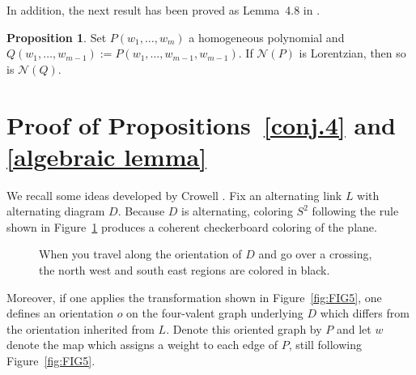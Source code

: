 \documentclass[12pt,reqno]{amsart}
\theoremstyle{definition}
\newtheorem{proposition}[theorem]{Proposition}
\def\normal{\mathcal{N}}
\begin{document}
In addition, the next result has been proved as Lemma~4.8 in \cite{branden2023lower}.

\begin{proposition}
    Set $P(w_1, \ldots,  w_m)$ a homogeneous polynomial and $Q(w_1, \ldots, w_{m-1}) := P(w_1, \ldots, w_{m-1}, w_{m-1})$. If $\normal(P)$ is Lorentzian, then so is $\normal(Q)$.
\end{proposition}



\section{Proof of Propositions~\ref{conj.4} and \ref{algebraic lemma}}\label{sec:Proof}

We recall some ideas developed by Crowell \cite{Cro}. Fix an alternating link $L$ with alternating diagram $D$. Because $D$ is alternating, coloring $S^2$ following the rule shown in Figure~\ref{fig:FIG4} produces a coherent checkerboard coloring of the plane. 

\begin{figure}[h!]
\caption{When you travel along the orientation of $D$ and go over a crossing, the north west and south east regions are colored in black.}\label{fig:FIG4}
\end{figure} 
Moreover, if one applies the transformation shown in Figure~\ref{fig:FIG5}, one defines an orientation $o$ on the four-valent graph underlying $D$ which differs from the orientation inherited from $L$. Denote this oriented graph by $P$ and let $w$ denote the map which assigns a weight to each edge of $P$, still following Figure~\ref{fig:FIG5}.
\end{document}
